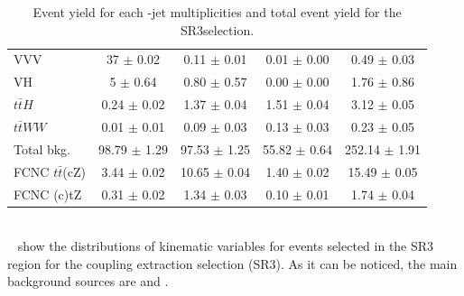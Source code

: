 \begin{table}[!h]
\begin{tabular}{|l|c|c|c|c|}
		VVV &                   37 $\pm$ 0.02     & 0.11 $\pm$ 0.01   & 0.01 $\pm$ 0.00   &  0.49 $\pm$ 0.03   \\
		VH &                    5 $\pm$ 0.64      & 0.80 $\pm$ 0.57   & 0.00 $\pm$ 0.00   &  1.76 $\pm$ 0.86   \\
		$t\bar{t}H$ &           0.24 $\pm$ 0.02   & 1.37 $\pm$ 0.04   & 1.51 $\pm$ 0.04   &  3.12 $\pm$ 0.05   \\
		$t\bar{t}WW$ &          0.01 $\pm$ 0.01   & 0.09 $\pm$ 0.03   & 0.13 $\pm$ 0.03   &  0.23 $\pm$ 0.05   \\
		\hline                                                                            
		Total bkg. &            98.79 $\pm$ 1.29  & 97.53 $\pm$ 1.25  & 55.82 $\pm$ 0.64  &  252.14 $\pm$ 1.91  \\
		\hline                                                                            
		FCNC $t\bar{t}$(cZ) &        3.44 $\pm$ 0.02   & 10.65 $\pm$ 0.04  & 1.40 $\pm$ 0.02   &  15.49 $\pm$ 0.05  \\
		FCNC (c)tZ &            0.31 $\pm$ 0.02   & 1.34 $\pm$ 0.03   & 0.10 $\pm$ 0.01   &  1.74 $\pm$ 0.04  \\
		\hline                                                                                     
	\end{tabular}
	\caption{Event yield for each \Pqb-jet multiplicities and total event yield for the SR3\tZc selection.}
	\label{tab:yields:sr3}
\end{table}    
\\~ show the distributions of kinematic variables for events selected in the SR3 region for the \tZc coupling extraction selection (SR3\tZu).
As it can be noticed, the main background sources are \ttZ and \VVHF.

